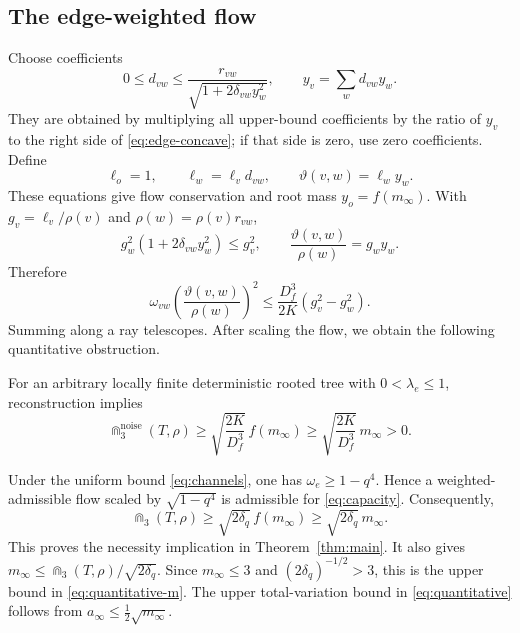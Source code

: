 \subsection{The edge-weighted flow}

Choose coefficients
\[
 0\le d_{vw}\le
 \frac{r_{vw}}{\sqrt{1+2\delta_{vw}y_w^2}},
 \qquad y_v=\sum_w d_{vw}y_w.
\]
They are obtained by multiplying all upper-bound coefficients by the ratio
of $y_v$ to the right side of \eqref{eq:edge-concave}; if that side is zero,
use zero coefficients. Define
\[
 \ell_o=1,
 \qquad \ell_w=\ell_vd_{vw},
 \qquad \vartheta(v,w)=\ell_wy_w.
\]
These equations give flow conservation and root mass $y_o=f(m_\infty)$.
With $g_v=\ell_v/\rho(v)$ and $\rho(w)=\rho(v)r_{vw}$,
\[
 g_w^2(1+2\delta_{vw}y_w^2)\le g_v^2,
 \qquad
 \frac{\vartheta(v,w)}{\rho(w)}=g_wy_w.
\]
Therefore
\[
 \omega_{vw}\left(\frac{\vartheta(v,w)}{\rho(w)}\right)^2
 \le \frac{D_f^3}{2K}(g_v^2-g_w^2).
\]
Summing along a ray telescopes. After scaling the flow, we obtain the
following quantitative obstruction.

\begin{theorem}\label{thm:weighted-necessity}
For an arbitrary locally finite deterministic rooted tree with
$0<\lambda_e\le1$, reconstruction implies
\begin{equation}\label{eq:weighted-necessity}
 \Cap_3^{\mathrm{noise}}(T,\rho)
 \ge \sqrt{\frac{2K}{D_f^3}}\,f(m_\infty)
 \ge \sqrt{\frac{2K}{D_f^3}}\,m_\infty>0.
\end{equation}
\end{theorem}

Under the uniform bound \eqref{eq:channels}, one has
$\omega_e\ge1-q^4$. Hence a weighted-admissible flow scaled by
$\sqrt{1-q^4}$ is admissible for \eqref{eq:capacity}. Consequently,
\begin{equation}\label{eq:necessityquant}
 \Cap_3(T,\rho)
 \ge\sqrt{2\delta_q}\,f(m_\infty)
 \ge\sqrt{2\delta_q}\,m_\infty.
\end{equation}
This proves the necessity implication in Theorem~\ref{thm:main}. It also gives
$m_\infty\le\Cap_3(T,\rho)/\sqrt{2\delta_q}$. Since $m_\infty\le3$ and
$(2\delta_q)^{-1/2}>3$, this is the upper bound in
\eqref{eq:quantitative-m}. The upper total-variation bound in
\eqref{eq:quantitative} follows from $a_\infty\le\tfrac12\sqrt{m_\infty}$.
